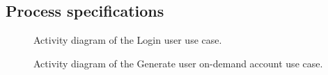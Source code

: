 \documentclass[12pt]{article}
\begin{document}
\vspace{0.2in}
\newpage
\subsection{Process specifications}
\vspace{0.2in}

\begin{figure}[H]
\centering	
{}
\caption{Activity diagram of the Login user use case.}
\end{figure}

\begin{figure}[H]
\centering	
{}
\caption{Activity diagram of the Generate user on-demand account use case.}
\end{figure}
\end{document}
